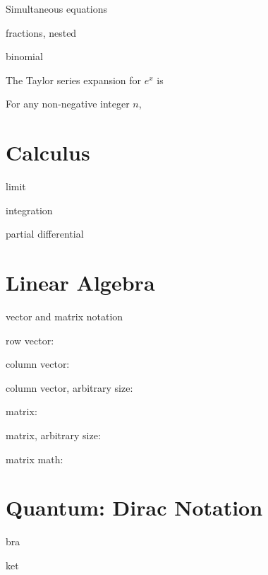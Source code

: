 \documentclass{article}
\begin{document}
Simultaneous equations


fractions, nested




binomial


The Taylor series expansion for $e^x$ is 


For any non-negative integer $n$,


\section{Calculus}
limit


integration






partial differential


\section{Linear Algebra}
vector and matrix notation
    


row vector:


column vector:


column vector, arbitrary size:



matrix:


matrix, arbitrary size:


matrix math:


\section{Quantum: Dirac Notation}

bra


ket





\end{document}

